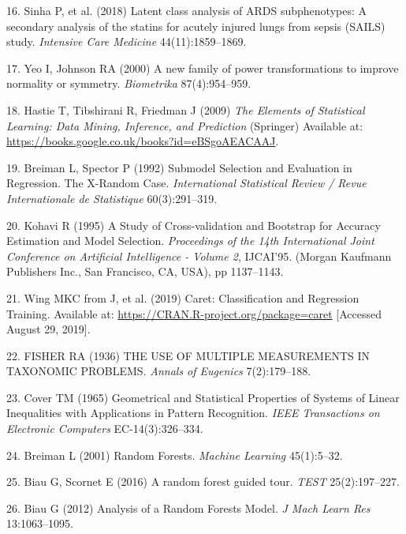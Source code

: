 \documentclass[12pt,]{article}
\begin{document}
\hypertarget{ref-sinha_latent_2018}{}
16. Sinha P, et al. (2018) Latent class analysis of ARDS subphenotypes:
A secondary analysis of the statins for acutely injured lungs from
sepsis (SAILS) study. \emph{Intensive Care Medicine} 44(11):1859--1869.

\hypertarget{ref-yeo_new_2000}{}
17. Yeo I, Johnson RA (2000) A new family of power transformations to
improve normality or symmetry. \emph{Biometrika} 87(4):954--959.

\hypertarget{ref-hastie_elements_2009}{}
18. Hastie T, Tibshirani R, Friedman J (2009) \emph{The Elements of
Statistical Learning: Data Mining, Inference, and Prediction} (Springer)
Available at: \url{https://books.google.co.uk/books?id=eBSgoAEACAAJ}.

\hypertarget{ref-breiman_submodel_1992}{}
19. Breiman L, Spector P (1992) Submodel Selection and Evaluation in
Regression. The X-Random Case. \emph{International Statistical Review /
Revue Internationale de Statistique} 60(3):291--319.

\hypertarget{ref-kohavi_study_1995}{}
20. Kohavi R (1995) A Study of Cross-validation and Bootstrap for
Accuracy Estimation and Model Selection. \emph{Proceedings of the 14th
International Joint Conference on Artificial Intelligence - Volume 2},
IJCAI'95. (Morgan Kaufmann Publishers Inc., San Francisco, CA, USA), pp
1137--1143.

\hypertarget{ref-wing_caret:_2019}{}
21. Wing MKC from J, et al. (2019) Caret: Classification and Regression
Training. Available at: \url{https://CRAN.R-project.org/package=caret}
{[}Accessed August 29, 2019{]}.

\hypertarget{ref-fisher_use_1936}{}
22. FISHER RA (1936) THE USE OF MULTIPLE MEASUREMENTS IN TAXONOMIC
PROBLEMS. \emph{Annals of Eugenics} 7(2):179--188.

\hypertarget{ref-cover_geometrical_1965}{}
23. Cover TM (1965) Geometrical and Statistical Properties of Systems of
Linear Inequalities with Applications in Pattern Recognition. \emph{IEEE
Transactions on Electronic Computers} EC-14(3):326--334.

\hypertarget{ref-breiman_random_2001}{}
24. Breiman L (2001) Random Forests. \emph{Machine Learning}
45(1):5--32.

\hypertarget{ref-biau_random_2016}{}
25. Biau G, Scornet E (2016) A random forest guided tour. \emph{TEST}
25(2):197--227.

\hypertarget{ref-biau_analysis_2012}{}
26. Biau G (2012) Analysis of a Random Forests Model. \emph{J Mach Learn
Res} 13:1063--1095.
\end{document}
